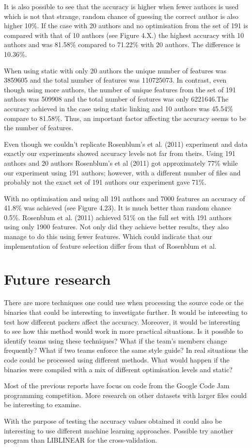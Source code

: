 \documentclass[a4paper,11pt]{kth-mag}
\begin{document}
It is also possible to see that the accuracy is higher when fewer authors is
used which is not that strange, random chance of guessing the correct author is
also higher 10\%. If the case with 20 authors and no optimisation from the set
of 191 is compared with that of 10 authors (see Figure 4.X.) the highest
accuracy with 10 authors and was 81.58\% compared to 71.22\% with 20 authors.
The difference is 10.36\%.

When using static with only 20 authors the unique number of features was
3859605 and the total number of features was 110725073. In contrast, even
though using more authors,  the number of unique features from the set of 191
authors was 509908 and the total number of features was only 6221646.The
accuracy achieved in the case using static linking and 10 authors was 45.54\%
compare to 81.58\%. Thus, an important factor affecting the accuracy seems to
be the number of features. 

Even though we couldn’t replicate Rosenblum’s et al. (2011) experiment and data
exactly our experiments showed accuracy levels not far from theirs. Using 191
authors and 20 authors Rosenblum’s et al (2011) got approximately 77\% while
our experiment using 191 authors; however, with a different number of files and
probably not the exact set of 191 authors our experiment gave 71\%.     

With no optimisation and using all 191 authors and 7000 features an accuracy of
41.8\% was achieved (see Figure 4.23). It is much better than random chance
0.5\%. Rosenblum et al. (2011) achieved 51\% on the full set with 191 authors
using only 1900 features. Not only did they achieve better results, they also
manage to do this using fewer features. Which could indicate that our
implementation of feature selection differ from that of Rosenblum et al.

\section{Future research}
There are more techniques one could use when processing the source code or the
binaries that could be interesting to investigate further. It would be
interesting to test how different packers affect the accuracy. Moreover, it
would be interesting to see how this method would work in more practical
situations. Is it possible to identify teams using these techniques? What if
the team’s members change frequently? What if two teams enforce the same style
guide? In real situations the code could be processed using different methods.
What would happen if the binaries were compiled with a mix of different
optimisation levels and static?  

Most of the previous reports have focus on code from the Google Code Jam
programming competition. More research on other datasets with larger files
could be interesting to examine.

With the purpose of testing the accuracy values obtained it could also be
interesting to use different machine learning approaches. Possible try another
program than LIBLINEAR for the cross-validation.
\end{document}
